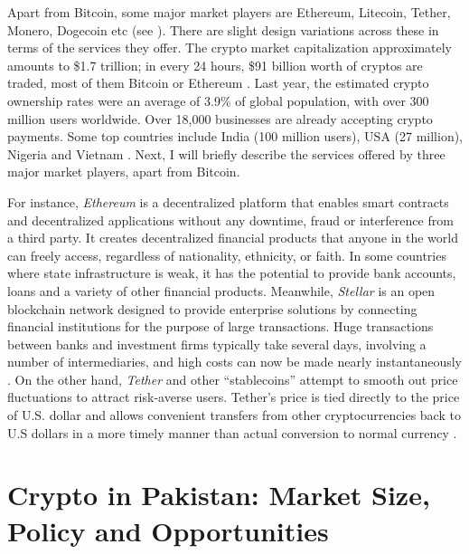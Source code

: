 \documentclass[12pt]{article}
\newcommand{\1}{\mathbbm 1}
\begin{document}
			
			 Apart from Bitcoin, some major market players are Ethereum, Litecoin, Tether, Monero, Dogecoin etc (see \cite{hayesinvestopedia2022}). There are slight design variations across these in terms of the services they offer. The crypto market capitalization approximately amounts to \$1.7 trillion; in every 24 hours, \$91 billion worth of cryptos are traded, most of them Bitcoin or Ethereum \cite{whiteWEF2022}. Last year, the estimated crypto ownership rates were an average of 3.9\% of global population, with over 300 million users worldwide. Over 18,000 businesses are already accepting crypto payments. Some top countries include India (100 million users), USA (27 million), Nigeria and Vietnam \cite{tripleA2022}. Next, I will briefly describe the services offered by three major market players, apart from Bitcoin.
			
			 For instance, \textit{Ethereum} is a decentralized platform that enables smart contracts and decentralized applications without any downtime, fraud or interference from a third party. It creates decentralized financial products that anyone in the world can freely access, regardless of nationality, ethnicity, or faith. In some countries where state infrastructure is weak, it has the potential to provide bank accounts, loans and a variety of other financial products. Meanwhile, \textit{Stellar} is an open blockchain network designed to provide enterprise solutions by connecting financial institutions for the purpose of large transactions. Huge transactions between banks and investment firms typically take several days, involving a number of intermediaries, and high costs can now be made nearly instantaneously \cite{hayesinvestopedia2022}. On the other hand, \textit{Tether} and other ``stablecoins'' attempt to smooth out price fluctuations to attract risk-averse users. Tether's price is tied directly to the price of U.S. dollar and allows convenient transfers from other cryptocurrencies back to U.S dollars in a more timely manner than actual conversion to normal currency \cite{hayesinvestopedia2022}. 
			
		
			
			
			
			
			
			
				
			
			
			
			
			
\section{Crypto in Pakistan: Market Size, Policy and Opportunities}
			
\end{document}
